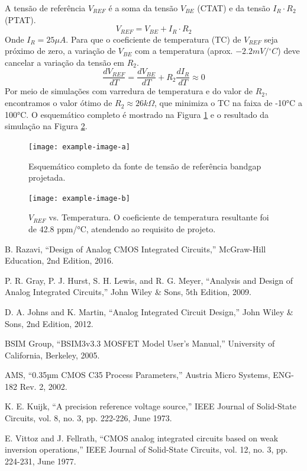 \documentclass[12pt,a4paper]{article}
\newcommand{\degree}{\ensuremath{{}^\circ}}
\begin{document}
A tensão de referência $V_{REF}$ é a soma da tensão $V_{BE}$ (CTAT) e da tensão $I_R \cdot R_2$ (PTAT).
\begin{equation}
V_{REF} = V_{BE} + I_R \cdot R_2
\end{equation}
Onde $I_R = 25\mu A$. Para que o coeficiente de temperatura (TC) de $V_{REF}$ seja próximo de zero, a variação de $V_{BE}$ com a temperatura (aprox. $-2.2mV/\degree C$) deve cancelar a variação da tensão em $R_2$.
\begin{equation}
\frac{dV_{REF}}{dT} = \frac{dV_{BE}}{dT} + R_2 \frac{dI_R}{dT} \approx 0
\end{equation}
Por meio de simulações com varredura de temperatura e do valor de $R_2$, encontramos o valor ótimo de $R_2 \approx 26k\Omega$, que minimiza o TC na faixa de -10°C a 100°C. O esquemático completo é mostrado na Figura \ref{fig:bandgap_complete_schematic} e o resultado da simulação na Figura \ref{fig:vref_vs_temp}.

\begin{figure}[H]
\centering
\texttt{[image: example-image-a]}
\caption{Esquemático completo da fonte de tensão de referência bandgap projetada.}
\label{fig:bandgap_complete_schematic}
\end{figure}

\begin{figure}[H]
\centering
\texttt{[image: example-image-b]}
\caption{$V_{REF}$ vs. Temperatura. O coeficiente de temperatura resultante foi de 42.8 ppm/°C, atendendo ao requisito de projeto.}
\label{fig:vref_vs_temp}
\end{figure}

{}
\begin{thebibliography}{99}
     B. Razavi, ``Design of Analog CMOS Integrated Circuits,'' McGraw-Hill Education, 2nd Edition, 2016.
    
     P. R. Gray, P. J. Hurst, S. H. Lewis, and R. G. Meyer, ``Analysis and Design of Analog Integrated Circuits,'' John Wiley \& Sons, 5th Edition, 2009.
    
     D. A. Johns and K. Martin, ``Analog Integrated Circuit Design,'' John Wiley \& Sons, 2nd Edition, 2012.
    
     BSIM Group, ``BSIM3v3.3 MOSFET Model User's Manual,'' University of California, Berkeley, 2005.
    
     AMS, ``0.35µm CMOS C35 Process Parameters,'' Austria Micro Systems, ENG-182 Rev. 2, 2002.
    
     K. E. Kuijk, ``A precision reference voltage source,'' IEEE Journal of Solid-State Circuits, vol. 8, no. 3, pp. 222-226, June 1973.
    
     E. Vittoz and J. Fellrath, ``CMOS analog integrated circuits based on weak inversion operations,'' IEEE Journal of Solid-State Circuits, vol. 12, no. 3, pp. 224-231, June 1977.
\end{thebibliography}
\end{document}
